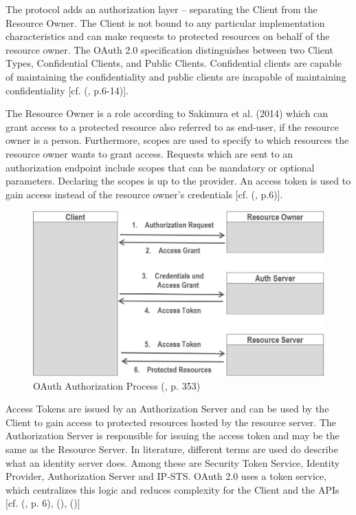 {{		The protocol adds an authorization layer – separating the Client from the Resource Owner. 
		The Client is not bound to any particular implementation characteristics and can make requests to protected resources on behalf of the resource owner. The OAuth 2.0 specification distinguishes between two Client Types, Confidential Clients, and Public Clients. Confidential clients are capable of maintaining the confidentiality and public clients are incapable of maintaining confidentiality [cf. (\cite{Hardt:2012:OAuth2}, p.6-14)].
		
		The Resource Owner is a role according to Sakimura et al. (2014) which can grant access to a protected resource also referred to as end-user, if the resource owner is a person. Furthermore, scopes are used to specify to which resources the resource owner wants to grant access. Requests which are sent to an authorization endpoint include scopes that can be mandatory or optional parameters. Declaring the scopes is up to the provider. An access token is used to gain access instead of the resource owner’s credentials [cf. (\cite{Sakimura:2014:OpenIDConnect}, p.6)]. 
		
			\begin{figure}[h]
			\centering
			\includegraphics[width=0.8\linewidth]{images/oaut-process2}
			\caption{OAuth Authorization Process (\cite{LeBlanc:2011:SocialApplications}, p. 353)}
			\label{fig:oaut-process2}
		\end{figure}
		
		Access Tokens are issued by an Authorization Server and can be used by the Client to gain access to protected resources hosted by the resource server. The Authorization Server is responsible for issuing the access token and may be the same as the Resource Server. In literature, different terms are used do describe what an identity server does. Among these are Security Token Service, Identity Provider, Authorization Server and IP-STS. OAuth 2.0 uses a token service, which centralizes this logic and reduces complexity for the Client and the APIs [cf. (\cite{Sakimura:2014:OpenIDConnect}, p. 6), (\cite{Brock:2018:ID4}), (\cite{Boyd:2012:GSOAuth})]
		
}}

